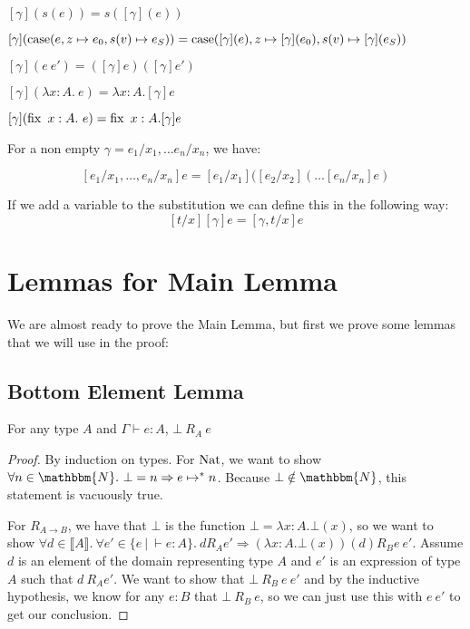 \vspace{0.5cm}

\begin{adjustwidth}{2cm}{}

$[\gamma](s(e)) = s([\gamma] (e))$

$[\gamma](\operatorname{case} (e, z \mapsto e_0, s(v) \mapsto e_S)) = \operatorname{case} ([\gamma](e), z \mapsto [\gamma](e_0), s(v) \mapsto [\gamma](e_S))$

$[\gamma](e \ e') = ([\gamma] e) ([\gamma] e')$

$[\gamma] (\lambda x:A. \ e) = \lambda x:A. [\gamma] e$

$[\gamma] (\operatorname{fix} \ x:A. \ e) = \operatorname{fix} \ x:A. [\gamma] e$
\end{adjustwidth}

\vspace{0.5cm}

For a non empty $\gamma = e_1/x_1, \dots e_n/x_n$, we have:

\[ [e_1/x_1, \dots , e_n/x_n] e = [e_1/x_1]([e_2/x_2]( \dots [e_n/x_n] e) \]

If we add a variable to the substitution we can define this in the following way:
\[ [t/x][\gamma] e = [\gamma, t/x] e \]

\section{Lemmas for Main Lemma}
We are almost ready to prove the Main Lemma, but first we prove some lemmas that we will use in the proof:


\subsection{Bottom Element Lemma}

\vspace{0.25cm}

\begin{lem} \label{bot}
For any type $A$ and $\Gamma \vdash e: A$, $\bot \ R_A \ e$ 
\end{lem}

\begin{proof}
By induction on types. For $\operatorname{Nat}$, we want to show $\forall n \in \mathbbm{N}. \ \bot  = n \Rightarrow e \mapsto^* n$. Because $\bot \notin \mathbbm{N}$, this statement is vacuously true.

For $R_{A \to B}$, we have that $\bot$ is the function $\bot = \lambda x : A. \bot(x)$, so we want to show $\forall  d \in \llbracket A \rrbracket. \ \forall e' \in \{ e \ | \ \vdash e : A\}. \ d R_A e' \Rightarrow (\lambda x : A. \bot(x))(d) R_B  e \ e'$. Assume $d$ is an element of the domain representing type $A$ and $e'$ is an expression of type $A$ such that $d \ R_A e'$. We want to show that $\bot \ R_B \ e \ e'$ and by the inductive hypothesis, we know for any $e : B$ that $\bot \ R_B \ e$, so we can just use this with $e \ e'$ to get our conclusion.
\end{proof}

